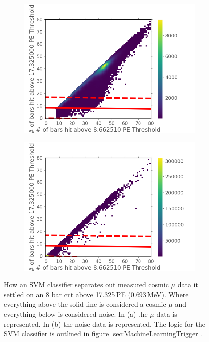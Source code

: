 \begin{figure}[!h]
\centering
\begin{subfigure}{.5\textwidth}
  \centering
  \includegraphics[width=\linewidth]{Chapter5/Figs/Raster/Cosmic8BarSignalCutSVM.png}
  \captionsetup{width=.9\linewidth}
  \caption{}
  \label{subFig:cosmic8BarSignalCutSVM}
\end{subfigure}%
\begin{subfigure}{.5\textwidth}
  \centering
\includegraphics[width=\linewidth]{Chapter5/Figs/Raster/Cosmic8BarNoiseCutSVM.png}
  \captionsetup{width=.9\linewidth}
  \caption{}
  \label{subFig:cosmic8BarNoiseCutSVM}
\end{subfigure}
\caption{How an SVM classifier separates out measured cosmic $\mu$ data it settled on an 8 bar cut above 17.325\,PE (0.693\,MeV). Where everything above the solid line is considered a cosmic $\mu$ and everything below is considered noise. In (a) the $\mu$ data is represented. In (b) the noise data is represented. The logic for the SVM classifier is outlined in figure \ref{sec:MachineLearningTrigger}. }
\label{fig:cosmic8BarSignalNoiseCutSVM}
\end{figure}

